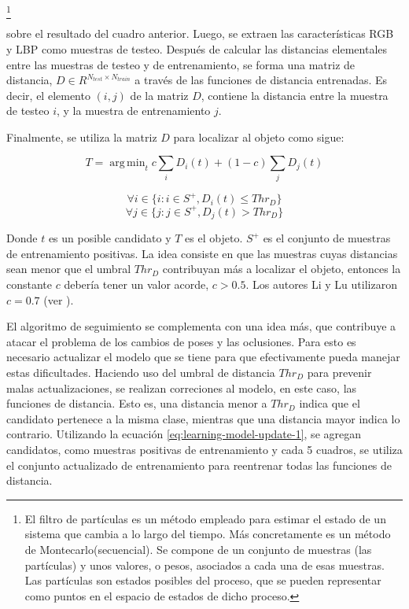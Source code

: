 \documentclass[a4paper,10pt]{article}
\DeclareMathOperator*{\argmin}{arg\,min}
\begin{document}
\footnote{El filtro de partículas es un método empleado para estimar el estado
  de un sistema que cambia a lo largo del tiempo. Más concretamente es un
  método de Montecarlo(secuencial). Se compone de un conjunto de muestras (las
  partículas) y unos valores, o pesos, asociados a cada una de esas muestras.
  Las partículas son estados posibles del proceso, que se pueden representar
  como puntos en el espacio de estados de dicho proceso.}

sobre el resultado del cuadro anterior. Luego, se extraen las características
RGB y LBP como muestras de testeo. Después de calcular las distancias
elementales entre las muestras de testeo y de entrenamiento, se forma una
matriz de distancia, $D \in R^{N_{test} \times N_{train}}$ a través de las
funciones de distancia entrenadas. Es decir, el elemento $(i,j)$ de la matriz
$D$, contiene la distancia entre la muestra de testeo $i$, y la muestra de
entrenamiento $j$.

Finalmente, se utiliza la matriz $D$ para localizar al objeto como sigue:

\begin{equation}
    T = \argmin_{t} c \sum_{i} D_{i}(t) + (1 - c) \sum_{j} D_{j}(t)
\end{equation}

\begin{equation}
    \forall i \in \{i : i \in S^{+}, D_{i}(t) \leq Thr_{D} \}
\end{equation}
\begin{equation}
    \forall j \in \{j : j \in S^{+}, D_{j}(t) > Thr_{D} \}
\end{equation}

Donde $t$ es un posible candidato y $T$ es el objeto. $S^{+}$ es el
conjunto de muestras de entrenamiento positivas. La idea consiste en
que las muestras cuyas distancias sean menor que el umbral $Thr_{D}$
contribuyan más a localizar el objeto, entonces la constante $c$ debería tener
un valor acorde, $c > 0.5$. Los autores Li y Lu utilizaron $c = 0.7$ (ver
\cite{local-learning}).

El algoritmo de seguimiento se complementa con una idea más, que
contribuye a atacar el problema de los cambios de poses y las oclusiones.
Para esto es necesario actualizar el modelo que se tiene para
que efectivamente pueda manejar estas dificultades.
Haciendo uso del umbral de distancia $Thr_{D}$ para prevenir
malas actualizaciones, se realizan correciones al modelo,
en este caso, las funciones de distancia. Esto es, una distancia
menor a $Thr_{D}$ indica que el candidato pertenece a la misma clase,
mientras que una distancia mayor indica lo contrario. Utilizando
la ecuación \ref{eq:learning-model-update-1}, se agregan candidatos,
como muestras positivas de entrenamiento y cada 5 cuadros,
se utiliza el conjunto actualizado de entrenamiento para
reentrenar todas las funciones de distancia.
\end{document}
